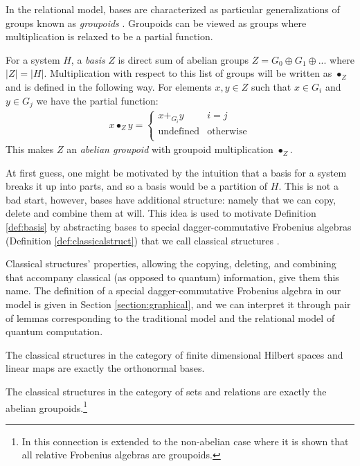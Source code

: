 In the relational model, bases are characterized as particular generalizations of groups known as \textit{groupoids} \cite{cqm-notes,pavlovic2009quantum}.  Groupoids can be viewed as groups where multiplication is relaxed to be a partial function.

\begin{defn}
\label{def:basis}
For a system $H$, a \emph{basis} $Z$ is direct sum of abelian groups $Z = G_0\oplus G_1\oplus...$ where $|Z| = |H|$.
Multiplication with respect to this list of groups will be written as $\bullet_Z$ and is defined in the following way. For elements $x,y\in Z$ such that $x\in G_i$ and $y\in G_j$ we have the partial function:
\begin{align}
\label{eq:groupoid_mult}
x\bullet_Zy = \begin{cases}
x +_{G_i} y & i=j \\
\mbox{undefined} & \mbox{otherwise}\\
\end{cases}
\end{align}
\noindent This makes $Z$ an \emph{abelian groupoid} with groupoid multiplication $\bullet_Z$.
\end{defn}

At first guess, one might be motivated by the intuition that a basis for a system breaks it up into parts, and so a basis would be a partition of $H$.  This is not a bad start, however, bases have additional structure: namely that we can copy, delete and combine them at will.  This idea is used to motivate Definition \ref{def:basis} by abstracting bases to special dagger-commutative Frobenius algebras (Definition \ref{def:classicalstruct}) that we call classical structures \cite{coecke2013new}.

Classical structures' properties, allowing the copying, deleting, and combining that accompany classical (as opposed to quantum) information, give them this name. The definition of a special dagger-commutative Frobenius algebra in our model is given in Section \ref{section:graphical}, and we can interpret it through pair of lemmas corresponding to the traditional model and the relational model of quantum computation.
\begin{lemma}
\label{lem:sdfa-hilb}
The classical structures in the category of finite dimensional Hilbert spaces and linear maps are exactly the orthonormal bases.
\end{lemma}

\begin{lemma}
\label{lem:sdfa-rel}
The classical structures in the category of sets and relations are exactly the abelian groupoids.\footnote{In \cite{heunen-relFrob} this connection is extended to the non-abelian case where it is shown that all relative Frobenius algebras are groupoids.}
\end{lemma}

